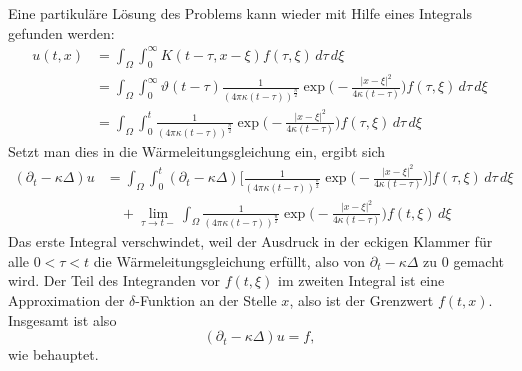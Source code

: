 Eine partikuläre Lösung des Problems kann wieder mit Hilfe eines Integrals
gefunden werden:
\begin{align*}
u(t,x)
&=
\int_\Omega\int_0^\infty
K(t-\tau,x-\xi)f(\tau,\xi)
\,d\tau\,d\xi
\\
&=
\int_\Omega\int_0^\infty
\vartheta(t-\tau)\frac1{(4\pi\kappa(t-\tau))^{\frac{n}2}}
\exp\biggl(-\frac{|x-\xi|^2}{4\kappa(t-\tau)}\biggr)
f(\tau,\xi)
\,d\tau\,d\xi
\\
&=
\int_\Omega\int_0^t
\frac1{(4\pi\kappa(t-\tau))^{\frac{n}2}}
\exp\biggl(-\frac{|x-\xi|^2}{4\kappa(t-\tau)}\biggr)
f(\tau,\xi)
\,d\tau\,d\xi
\end{align*}
Setzt man dies in die Wärmeleitungsgleichung ein, ergibt sich
\begin{align*}
(\partial_t-\kappa\Delta)u
&=
\int_\Omega\int_0^t
(\partial_t-\kappa\Delta)\biggl[
\frac1{(4\pi\kappa(t-\tau))^{\frac{n}2}}
\exp\biggl(-\frac{|x-\xi|^2}{4\kappa(t-\tau)}\biggr)\biggr]
f(\tau,\xi)
\,d\tau\,d\xi
\\
&\quad+
\lim_{\tau\to t-}
\int_\Omega
\frac1{(4\pi\kappa(t-\tau))^{\frac{n}2}}
\exp\biggl(-\frac{|x-\xi|^2}{4\kappa(t-\tau)}\biggr)
f(t,\xi)
\,d\xi
\end{align*}
Das erste Integral verschwindet, weil der Ausdruck in der eckigen Klammer
für alle $0<\tau<t$ die Wärmeleitungsgleichung erfüllt, also von
$\partial_t-\kappa\Delta$ zu $0$ gemacht wird.
Der Teil des Integranden vor $f(t,\xi)$ im zweiten Integral ist eine
Approximation der $\delta$-Funktion an der Stelle $x$, also ist der Grenzwert
$f(t,x)$. Insgesamt ist also
\[
(\partial_t-\kappa\Delta)u=f,
\]
wie behauptet.

